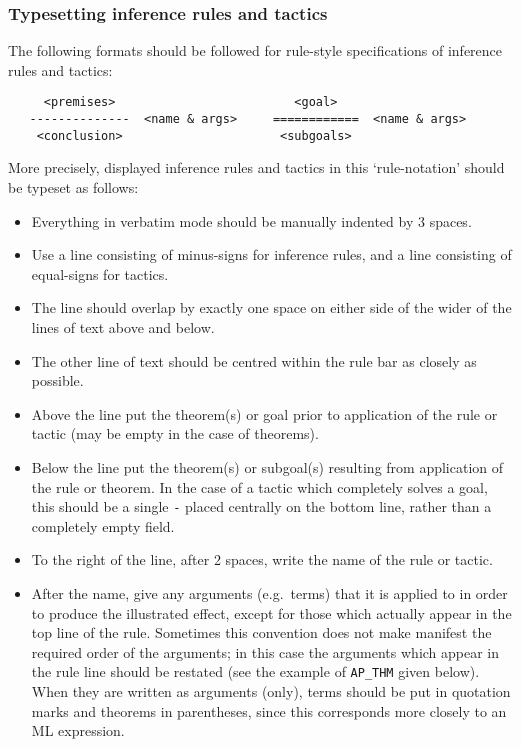 \subsubsection{Typesetting inference rules and tactics}

The following formats should be followed for rule-style specifications of
inference rules and tactics:

\medskip
\begin{verbatim}
     <premises>                         <goal>
   --------------  <name & args>     ============  <name & args>
    <conclusion>                      <subgoals>
\end{verbatim}
\medskip

\noindent More precisely, displayed inference rules and tactics in this
`rule-notation' should be typeset as follows:

\begin{itemize}

\item Everything in verbatim mode should be manually indented by 3 spaces.

\item Use a line consisting of minus-signs for inference rules, and a line
consisting of equal-signs for tactics.

\item The line should overlap by exactly one space on either side of the wider
of the lines of text above and below.

\item The other line of text should be centred within the rule bar as closely
as possible.

\item Above the line put the theorem(s) or goal prior to application of the
rule or tactic (may be empty in the case of theorems).

\item Below the line put the theorem(s) or subgoal(s) resulting from
application of the rule or theorem. In the case of a tactic which completely
solves a goal, this should be a single {\tt -} placed centrally on the bottom
line, rather than a completely empty field.

\item To the right of the line, after 2 spaces, write the name of the rule or
tactic.

\item After the name, give any arguments (e.g.\ terms) that it is applied to in
order to produce the illustrated effect, except for those which actually appear
in the top line of the rule. Sometimes this convention does not make manifest
the required order of the arguments; in this case the arguments which appear in
the rule line should be restated (see the example of {\small\verb!AP_THM!}
given below). When they are written as arguments (only), terms should be
put in quotation marks and theorems in parentheses, since this corresponds more
closely to an ML expression.

\end{itemize}

